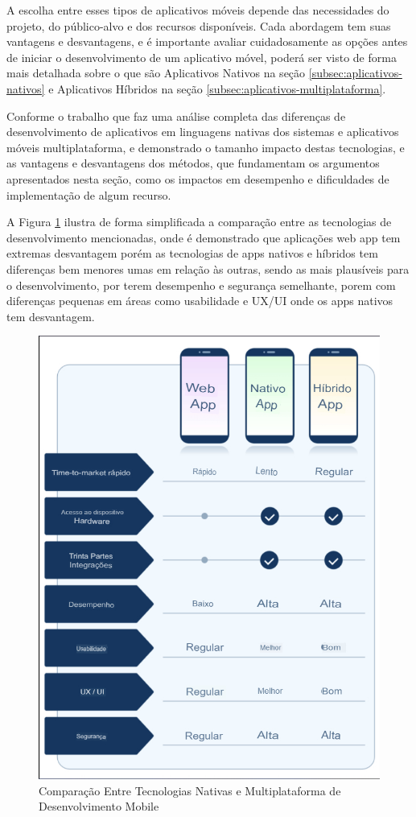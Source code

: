 \documentclass[
    12pt,                   %
    openright,              %
    oneside,                %
    a4paper,                %
    sumario=tradicional,    %
    english,                %
    brazil,                 %
    ]{abntex2}
\begin{document}
A escolha entre esses tipos de aplicativos móveis depende das necessidades do projeto, do público-alvo e dos recursos disponíveis. Cada abordagem tem suas vantagens e desvantagens, e é importante avaliar cuidadosamente as opções antes de iniciar o desenvolvimento de um aplicativo móvel, poderá ser visto de forma mais detalhada sobre o que são Aplicativos Nativos na seção \ref{subsec:aplicativos-nativos} e Aplicativos Híbridos na seção \ref{subsec:aplicativos-multiplataforma}.

Conforme o trabalho \cite{pinheiro-analise-apps-mobile} que faz uma análise completa das diferenças de desenvolvimento de aplicativos em linguagens nativas dos sistemas e aplicativos móveis multiplataforma, e demonstrado o tamanho impacto destas tecnologias, e as vantagens e desvantagens dos métodos, que fundamentam os argumentos apresentados nesta seção, como os impactos em desempenho e dificuldades de implementação de algum recurso.

A Figura \ref{fig:nativevsmultplataform} ilustra de forma simplificada a comparação entre as tecnologias de desenvolvimento mencionadas, onde é demonstrado que aplicações web app tem extremas desvantagem porém as tecnologias de apps nativos e híbridos tem diferenças bem menores umas em relação às outras, sendo as mais plausíveis para o desenvolvimento, por terem desempenho e segurança semelhante, porem com diferenças pequenas em áreas como usabilidade e UX/UI onde os apps nativos tem desvantagem.

\begin{figure}[!h]
  \begin{center}
  \centering
  \includegraphics[width=0.8\linewidth]{Imagens/NativevsMulplataforma.png}
  \end{center}
  \caption[Comparação entre Tecnologias de Desenvolvimento]{Comparação Entre Tecnologias Nativas e Multiplataforma de Desenvolvimento Mobile}
  \label{fig:nativevsmultplataform}
\end{figure}
\end{document}
